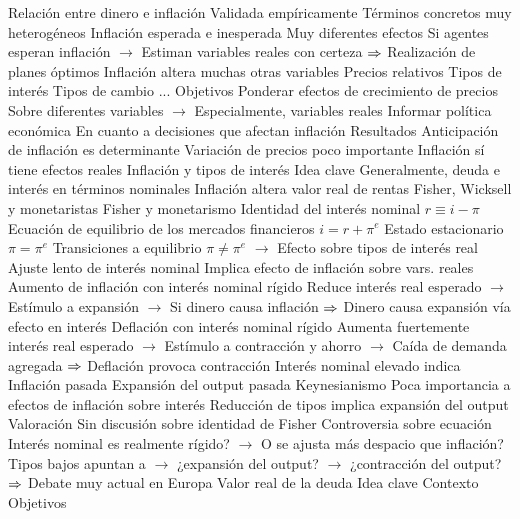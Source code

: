 \documentclass{nuevotema}
\begin{document}
\begin{esquemal}
				\4 Relación entre dinero e inflación
				\4[] Validada empíricamente
				\4[] Términos concretos muy heterogéneos
				\4 Inflación esperada e inesperada
				\4[] Muy diferentes efectos
				\4[] Si agentes esperan inflación
				\4[] $\to$ Estiman variables reales con certeza
				\4[] $\Rightarrow$ Realización de planes óptimos
				\4 Inflación altera muchas otras variables
				\4[] Precios relativos
				\4[] Tipos de interés
				\4[] Tipos de cambio
				\4[] ...
			\3 Objetivos
				\4 Ponderar efectos de crecimiento de precios
				\4[] Sobre diferentes variables
				\4[] $\to$ Especialmente, variables reales
				\4 Informar política económica
				\4[] En cuanto a decisiones que afectan inflación
			\3 Resultados
				\4 Anticipación de inflación es determinante
				\4 Variación de precios poco importante
				\4 Inflación sí tiene efectos reales
		\2 Inflación y tipos de interés
			\3 Idea clave
				\4 Generalmente, deuda e interés en términos nominales
				\4[$\to$] Inflación altera valor real de rentas
				\4 Fisher, Wicksell y monetaristas
			\3 Fisher y monetarismo
				\4 Identidad del interés nominal
				\4[] $r \equiv i - \pi$
				\4 Ecuación de equilibrio de los mercados financieros
				\4[] $i=r + \pi^e$
				\4 Estado estacionario
				\4[] $\pi = \pi^e$
				\4 Transiciones a equilibrio
				\4[] $\pi \neq \pi^e$
				\4[] $\to$ Efecto sobre tipos de interés real
				\4 Ajuste lento de interés nominal
				\4[] Implica efecto de inflación sobre vars. reales
				\4 Aumento de inflación con interés nominal rígido
				\4[] Reduce interés real esperado
				\4[] $\to$ Estímulo a expansión
				\4[] $\to$ Si dinero causa inflación
				\4[] $\Rightarrow$ Dinero causa expansión vía efecto en interés
				\4 Deflación con interés nominal rígido
				\4[] Aumenta fuertemente interés real esperado
				\4[] $\to$ Estímulo a contracción y ahorro
				\4[] $\to$ Caída de demanda agregada
				\4[] $\Rightarrow$ Deflación provoca contracción
				\4 Interés nominal elevado indica
				\4[] Inflación pasada
				\4[] Expansión del output pasada
			\3 Keynesianismo
				\4 Poca importancia a efectos de inflación sobre interés
				\4 Reducción de tipos implica expansión del output
			\3 Valoración
				\4 Sin discusión sobre identidad de Fisher
				\4 Controversia sobre ecuación
				\4[] Interés nominal es realmente rígido?
				\4[] $\to$ O se ajusta más despacio que inflación?
				\4[] Tipos bajos apuntan a
				\4[] $\to$ ¿expansión del output?
				\4[] $\to$ ¿contracción del output?
				\4[] $\Rightarrow$ Debate muy actual en Europa
		\2 Valor real de la deuda
			\3 Idea clave
				\4 Contexto
				\4 Objetivos

\end{esquemal}
\end{document}
